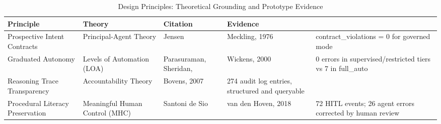 \begin{table}[h]
\centering
\caption{Design Principles: Theoretical Grounding and Prototype Evidence}
\label{tab:design_principles}
\small
\begin{tabular}{p{3cm}p{3cm}p{2.5cm}p{5cm}}
\hline
\textbf{Principle} & \textbf{Theory} & \textbf{Citation} & \textbf{Evidence} \\
\hline
Prospective Intent Contracts & Principal-Agent Theory & Jensen & Meckling, 1976 & contract_violations = 0 for governed mode \\
Graduated Autonomy & Levels of Automation (LOA) & Parasuraman, Sheridan, & Wickens, 2000 & 0 errors in supervised/restricted tiers vs 7 in full_auto \\
Reasoning Trace Transparency & Accountability Theory & Bovens, 2007 & 274 audit log entries, structured and queryable \\
Procedural Literacy Preservation & Meaningful Human Control (MHC) & Santoni de Sio & van den Hoven, 2018 & 72 HITL events; 26 agent errors corrected by human review \\
\hline
\end{tabular}
\end{table}
